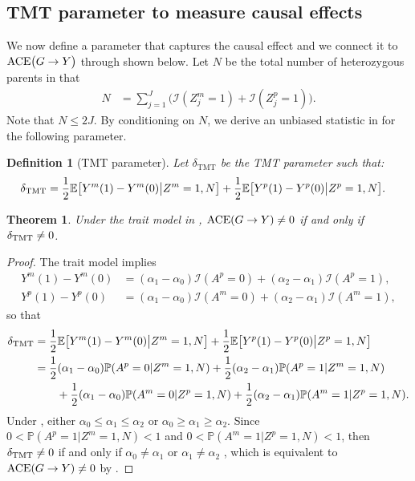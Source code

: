 \documentclass[12pt]{extarticle}
\newtheorem{thm}{Theorem}%
\newtheorem{defin}{Definition}%
\newcommand{\pp}{\mathbb{P}}
\newcommand{\E}{\mathbb{E}}
\newcommand{\nind}{J}
\newcommand{\indicator}{\mathcal{I}}
\newcommand{\ace}{{\normalfont \text{ACE}}}
\newcommand{\tmt}{{\normalfont \text{TMT}}}
\begin{document}
\subsection{TMT parameter to measure causal effects}\label{sec:tmt_ace}

We now define a parameter that captures the causal effect and we connect it to $\ace \big(G \to Y\big)$ through  shown below. Let $N$ be the total number of heterozygous parents in that 
\begin{align*}
N & = \sum_{j=1}^{\nind}\Big(\indicator(Z^m_j=1)+\indicator(Z^p_j=1)\Big).
\end{align*} Note that $N \leq 2J$. By conditioning on $N$, we derive an unbiased statistic in  for the following parameter.

\begin{defin}[TMT parameter]\label{def:tmt_param} 
Let $\delta_{\text{TMT}}$ be the TMT parameter such that: 
\begin{align*}
\delta_{\tmt} & = \frac{1}{2}\E\big[Y^m(1)-Y^m(0)\big|Z^m=1,N\big]+\frac{1}{2}\E\big[Y^p(1)-Y^p(0)\big|Z^p=1,N\big].
\end{align*}
\end{defin}  

\begin{thm} \label{thm:tmt_ace}
Under the trait model in , $\ace (G\to Y)\neq 0$ if and only if $\delta_{\tmt}\neq 0$.
\end{thm}

\begin{proof}
The trait model implies  
\begin{align*}
Y^m(1)-Y^m(0) &= (\alpha_1-\alpha_0)\indicator(A^p=0) + (\alpha_2-\alpha_1)\indicator(A^p=1), \nonumber \\
Y^p(1)-Y^p(0) &= (\alpha_1-\alpha_0)\indicator(A^m=0) + (\alpha_2-\alpha_1)\indicator(A^m=1),
\end{align*} 
so that 
{\allowdisplaybreaks
\begin{align*}
\delta_{\tmt} &= \frac{1}{2}\E\big[Y^m(1)-Y^m(0)\big|Z^m=1,N\big]+\frac{1}{2}\E\big[Y^p(1)-Y^p(0)\big|Z^p=1,N\big] \\
& = \frac{1}{2}(\alpha_1-\alpha_0)\pp(A^p=0|Z^m=1,N) + \frac{1}{2}(\alpha_2-\alpha_1)\pp(A^p=1|Z^m=1,N)  \\
& \qquad + \frac{1}{2}(\alpha_1-\alpha_0)\pp(A^m=0|Z^p=1,N) + \frac{1}{2}(\alpha_2-\alpha_1)\pp(A^m=1|Z^p=1,N).
\end{align*}}
Under , either $\alpha_0\leq \alpha_1 \leq \alpha_2$ or $\alpha_0\geq \alpha_1 \geq \alpha_2$. Since $0<\pp(A^p=1|Z^m=1,N)<1$ and $0<\pp(A^m=1|Z^p=1,N)<1$, then $\delta_{\tmt} \neq 0$ if and only if $\alpha_0\neq \alpha_1$ or $\alpha_1\neq \alpha_2$ , which is equivalent to $\ace(G\to Y) \neq 0$ by .
\end{proof}
\end{document}
